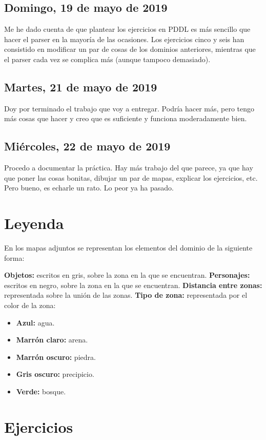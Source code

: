 \documentclass[11pt,a4paper]{article}
\begin{document}
\subsection*{Domingo, 19 de mayo de 2019}
Me he dado cuenta de que plantear los ejercicios en PDDL es más sencillo que hacer el parser en la mayoría de las ocasiones.
Los ejercicios cinco y seis han consistido en modificar un par de cosas de los dominios anteriores, mientras que el parser cada
vez se complica más (aunque tampoco demasiado).

\subsection*{Martes, 21 de mayo de 2019}
Doy por terminado el trabajo que voy a entregar. Podría hacer más, pero tengo más cosas que hacer y creo que es suficiente y funciona
moderadamente bien.

\subsection*{Miércoles, 22 de mayo de 2019}
Procedo a documentar la práctica. Hay más trabajo del que parece, ya que hay que poner las cosas bonitas, dibujar un par de mapas, explicar los ejercicios, etc. Pero bueno, es echarle un rato. Lo peor ya ha pasado.

\section{Leyenda}

En los mapas adjuntos se representan los elementos del dominio de la siguiente forma:

\textbf{Objetos:} escritos en gris, sobre la zona en la que se encuentran.
\textbf{Personajes:} escritos en negro, sobre la zona en la que se encuentran.
\textbf{Distancia entre zonas:} representada sobre la unión de las zonas.
\textbf{Tipo de zona:} representada por el color de la zona:
\begin{itemize}
\item \textbf{Azul:} agua.
\item \textbf{Marrón claro:} arena.
\item \textbf{Marrón oscuro:} piedra.
\item \textbf{Gris oscuro:} precipicio.
\item \textbf{Verde:} bosque.
\end{itemize}

\section{Ejercicios}
\end{document}
